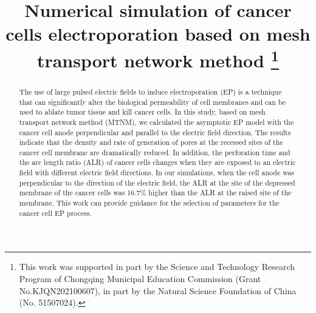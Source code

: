 \documentclass[conference]{IEEEtran}
\begin{document}
\title{Numerical simulation of cancer cells electroporation based on mesh transport network method
\thanks{This work was supported in part by the Science and Technology Research Program of Chongqing Municipal Education Commission (Grant No.KJQN202100607), in part by the Natural Science Foundation of China (No. 51507024).}
}
\author{
\and
{}
\and
{}
\and
{}
}
\maketitle

\begin{abstract}
The use of large pulsed electric fields to induce electroporation (EP) is a technique that can significantly alter the biological permeability of cell membranes and can be used to ablate tumor tissue and kill cancer cells. In this study, based on mesh transport network method (MTNM), we calculated the asymptotic EP model with the cancer cell anode perpendicular and parallel to the electric field direction. The results indicate that the density and rate of generation of pores at the recessed sites of the cancer cell membrane are dramatically reduced. In addition, the perforation time and the arc length ratio (ALR) of cancer cells changes when they are exposed to an electric field with different electric field directions. In our simulations, when the cell anode was perpendicular to the direction of the electric field, the ALR at the site of the depressed membrane of the cancer cells was 16.7\% higher than the ALR at the raised site of the membrane. This work can provide guidance for the selection of parameters for the cancer cell EP process.
\end{abstract}
\end{document}

